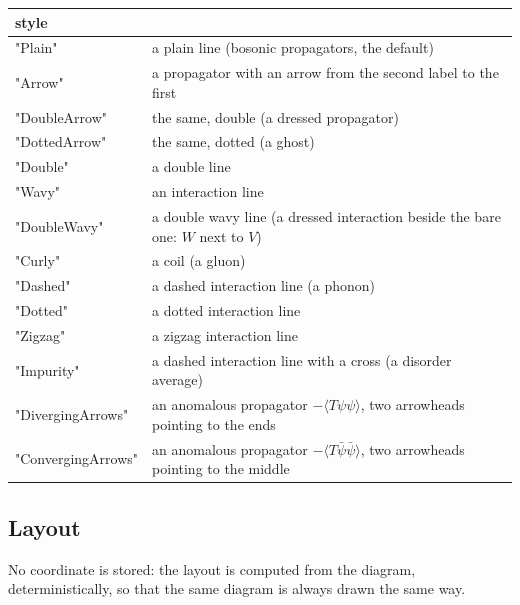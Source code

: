 \documentclass[11pt,a4paper]{article}
\begin{document}
\begin{center}
\small
\begin{tabularx}{\textwidth}{@{}>{\ttfamily\small}lX@{}}
\toprule
\textrm{style} & \\
\midrule
"Plain" & a plain line (bosonic propagators, the default)\\
"Arrow" & a propagator with an arrow from the second label to the first\\
"DoubleArrow" & the same, double (a dressed propagator)\\
"DottedArrow" & the same, dotted (a ghost)\\
"Double" & a double line\\
"Wavy" & an interaction line\\
"DoubleWavy" & a double wavy line (a dressed interaction beside the bare one: $W$ next to $V$)\\
"Curly" & a coil (a gluon)\\
"Dashed" & a dashed interaction line (a phonon)\\
"Dotted" & a dotted interaction line\\
"Zigzag" & a zigzag interaction line\\
"Impurity" & a dashed interaction line with a cross (a disorder average)\\
"DivergingArrows" & an anomalous propagator $-\langle T\psi\psi\rangle$, two arrowheads pointing to the ends\\
"ConvergingArrows" & an anomalous propagator $-\langle T\bar\psi\bar\psi\rangle$, two arrowheads pointing to the middle\\
\bottomrule
\end{tabularx}
\end{center}

\subsection{Layout}\label{sec:layout}

No coordinate is stored: the layout is computed from the diagram, deterministically, so that the same diagram is always
drawn the same way.
\end{document}
